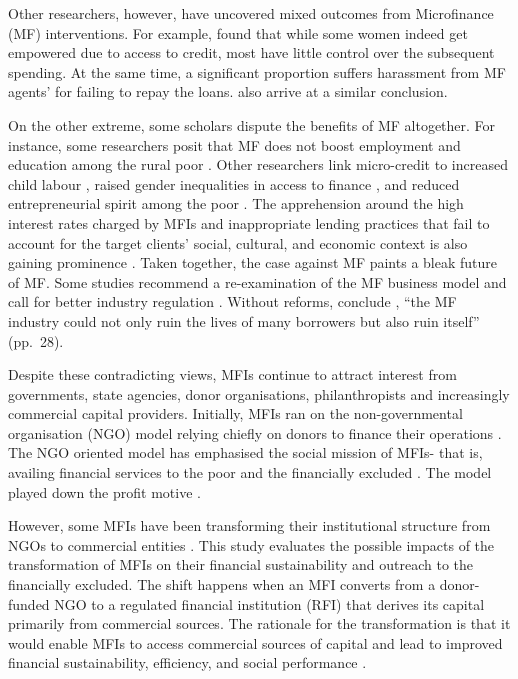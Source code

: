 \documentclass[a4paper, nobind]{templates/ociamthesis}
\begin{document}
Other researchers, however, have uncovered mixed outcomes from Microfinance (MF) interventions. For example, \textcite{ganle2015microcredit} found that while some women indeed get empowered due to access to credit, most have little control over the subsequent spending. At the same time, a significant proportion suffers harassment from MF agents' for failing to repay the loans. \textcite{van2012impact} also arrive at a similar conclusion.

On the other extreme, some scholars dispute the benefits of MF altogether. For instance, some researchers posit that MF does not boost employment and education among the rural poor \autocite{bauchet2013micro}. Other researchers link micro-credit to increased child labour \autocite{hazarika2008household}, raised gender inequalities in access to finance \autocite{zulfiqar2017does}, and reduced entrepreneurial spirit among the poor \autocite{field2013does}. The apprehension around the high interest rates charged by MFIs and inappropriate lending practices that fail to account for the target clients' social, cultural, and economic context is also gaining prominence \autocite{chester2016one}. Taken together, the case against MF paints a bleak future of MF. Some studies recommend a re-examination of the MF business model and call for better industry regulation \autocite{johnson2013microfinance,ghosh2013microfinance}. Without reforms, conclude \textcite{chester2016one}, ``the MF industry could not only ruin the lives of many borrowers but also ruin itself'' (pp.~28).

Despite these contradicting views, MFIs continue to attract interest from governments, state agencies, donor organisations, philanthropists and increasingly commercial capital providers. Initially, MFIs ran on the non-governmental organisation (NGO) model relying chiefly on donors to finance their operations \autocite{d2017ngos}. The NGO oriented model has emphasised the social mission of MFIs- that is, availing financial services to the poor and the financially excluded \autocite{ashta2012compartamos}. The model played down the profit motive \autocite{ashta2012compartamos}.

However, some MFIs have been transforming their institutional structure from NGOs to commercial entities \autocite{d2017ngos}. This study evaluates the possible impacts of the transformation of MFIs on their financial sustainability and outreach to the financially excluded. The shift happens when an MFI converts from a donor-funded NGO to a regulated financial institution (RFI) that derives its capital primarily from commercial sources. The rationale for the transformation is that it would enable MFIs to access commercial sources of capital and lead to improved financial sustainability, efficiency, and social performance \autocite{louis2013financial}.
\end{document}
